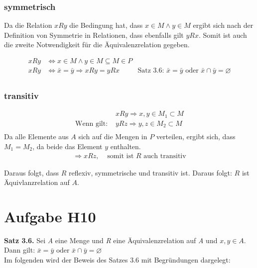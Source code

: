 \documentclass[11pt,a4paper]{article}
\begin{document}
\subsubsection*{symmetrisch}
Da die Relation \(xRy\) die Bedingung hat, dass \(x \in M \land y \in M\) ergibt sich nach der Definition von Symmetrie in Relationen, dass ebenfalls gilt \(yRx\). Somit ist auch die zweite Notwendigkeit für die Äquivalenzrelation gegeben.

\begin{align*}
xRy & \Leftrightarrow x \in M \land y \in M \subseteq M \in P  \\
xRy & \Leftrightarrow \bar{x} = \bar{y} \Rightarrow xRy = yRx & \text{Satz 3.6:~} \bar{x} = \bar{y} \text{~oder~} \bar{x} \cap \bar{y} = \varnothing\\
\end{align*}

\subsubsection*{transitiv}

\begin{align*}
~ & xRy \Rightarrow x,y \in M_1 \subset M\\
\text{Wenn gilt:~} & yRz \Rightarrow y,z \in M_2 \subset M \\
\end{align*}
Da alle Elemente aus \(A\) sich auf die Mengen in \(P\) verteilen, ergibt sich, dass \(M_1 = M_2\), da beide das Element \(y\) enthalten.
\begin{align*}
\Rightarrow xRz, & \text{~somit ist~} R \text{~auch transitiv}
\end{align*}

Daraus folgt, dass $R$ reflexiv, symmetrische und transitiv ist. Daraus folgt: $R$ ist Äquivlanzrelation auf $A$.
\section*{Aufgabe H10}

\textbf{Satz 3.6.} Sei \emph{A} eine Menge und \emph{R} eine Äquivalenzrelation auf \emph{A} und $x, y \in A$. \\
Dann gilt: $ \bar{x} = \bar{y} \text{~oder~} \bar{x} \cap \bar{y} = \varnothing$ \\

Im folgenden wird der Beweis des Satzes 3.6 mit Begründungen dargelegt:
\end{document}
